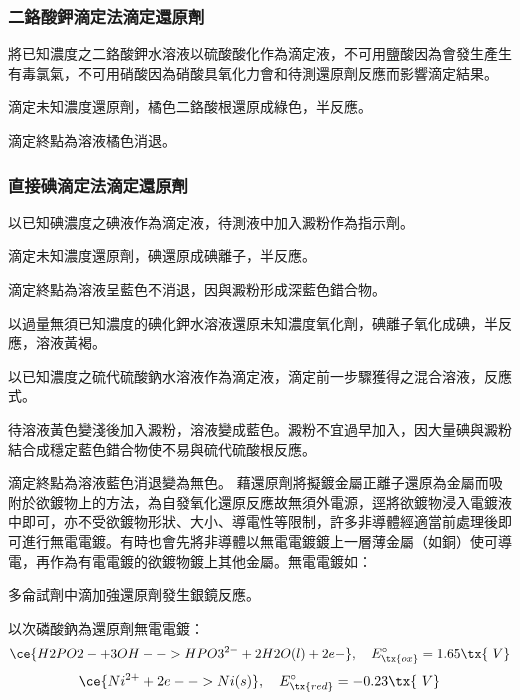 \documentclass[a4paper,12pt]{article}
\begin{document}
\subsubsection{二鉻酸鉀滴定法滴定還原劑}
\ben
\item 將已知濃度之二鉻酸鉀水溶液以硫酸酸化作為滴定液，不可用鹽酸因為會發生產生有毒氯氣，不可用硝酸因為硝酸具氧化力會和待測還原劑反應而影響滴定結果。
\item 滴定未知濃度還原劑，橘色二鉻酸根還原成綠色，半反應。
\item 滴定終點為溶液橘色消退。
\een
\subsubsection{直接碘滴定法滴定還原劑}
\ben
\item 以已知碘濃度之碘液作為滴定液，待測液中加入澱粉作為指示劑。
\item 滴定未知濃度還原劑，碘還原成碘離子，半反應。
\item 滴定終點為溶液呈藍色不消退，因與澱粉形成深藍色錯合物。
\een
{}
\ben
\item 以過量無須已知濃度的碘化鉀水溶液還原未知濃度氧化劑，碘離子氧化成碘，半反應，溶液黃褐。
\item 以已知濃度之硫代硫酸鈉水溶液作為滴定液，滴定前一步驟獲得之混合溶液，反應式。
\item 待溶液黃色變淺後加入澱粉，溶液變成藍色。澱粉不宜過早加入，因大量碘與澱粉結合成穩定藍色錯合物使不易與硫代硫酸根反應。
\item 滴定終點為溶液藍色消退變為無色。
\een
{}
藉還原劑將擬鍍金屬正離子還原為金屬而吸附於欲鍍物上的方法，為自發氧化還原反應故無須外電源，逕將欲鍍物浸入電鍍液中即可，亦不受欲鍍物形狀、大小、導電性等限制，許多非導體經適當前處理後即可進行無電電鍍。有時也會先將非導體以無電電鍍鍍上一層薄金屬（如銅）使可導電，再作為有電電鍍的欲鍍物鍍上其他金屬。無電電鍍如：
\bit
\item 多侖試劑中滴加強還原劑發生銀鏡反應。
\item 以次磷酸鈉為還原劑無電電鍍：
\[\ce{H2PO2- + 3OH- -> HPO3^{2-} + 2H2O(l) + 2e-},\quad E^{\circ}_{\tx{ox}}=1.65 \tx{\ V}\]
\[\ce{Ni^{2+} + 2e- -> Ni(s)},\quad E^{\circ}_{\tx{red}}=-0.23 \tx{\ V}\]
\eit
\end{document}
